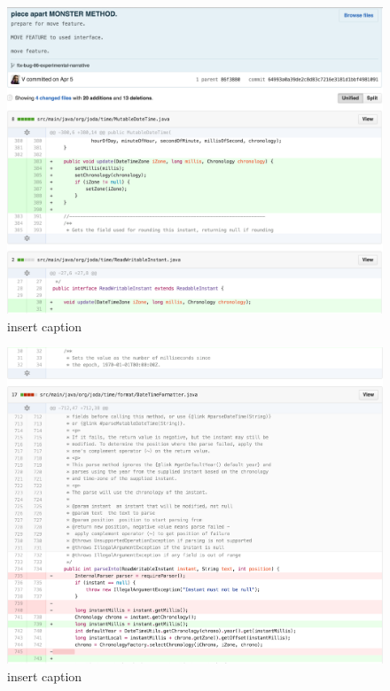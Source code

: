 \begin{figure}[H]
	\centering
	\includegraphics[width=\linewidth]{code53}
	\caption{insert caption}
\end{figure}
\begin{figure}[H]
	\centering
	\includegraphics[width=\linewidth]{code54}
	\caption{insert caption}
\end{figure}
